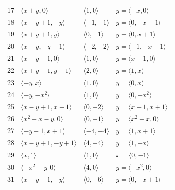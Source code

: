 \documentclass[11pt]{article}
\begin{document}
\begin{longtable}{@{}rlll@{}}
17 & $\langle x+y,0\rangle$ & $\langle 1,0\rangle$ & $y=\langle -x,0\rangle$\\
18 & $\langle x-y+1,-y\rangle$ & $\langle -1,-1\rangle$ & $y=\langle 0,-x-1\rangle$\\
19 & $\langle x+y+1,y\rangle$ & $\langle 0,-1\rangle$ & $y=\langle 0,x+1\rangle$\\
20 & $\langle x-y,-y-1\rangle$ & $\langle -2,-2\rangle$ & $y=\langle -1,-x-1\rangle$\\
21 & $\langle x-y-1,0\rangle$ & $\langle 1,0\rangle$ & $y=\langle x-1,0\rangle$\\
22 & $\langle x+y-1,y-1\rangle$ & $\langle 2,0\rangle$ & $y=\langle 1,x\rangle$\\
23 & $\langle -y,x\rangle$ & $\langle 1,0\rangle$ & $y=\langle 0,x\rangle$\\
24 & $\langle -y,-x^{2}\rangle$ & $\langle 1,0\rangle$ & $y=\langle 0,-x^{2}\rangle$\\
25 & $\langle x-y+1,x+1\rangle$ & $\langle 0,-2\rangle$ & $y=\langle x+1,x+1\rangle$\\
26 & $\langle x^{2}+x-y,0\rangle$ & $\langle 0,-1\rangle$ & $y=\langle x^{2}+x,0\rangle$\\
27 & $\langle -y+1,x+1\rangle$ & $\langle -4,-4\rangle$ & $y=\langle 1,x+1\rangle$\\
28 & $\langle x-y+1,-y+1\rangle$ & $\langle 4,-4\rangle$ & $y=\langle 1,-x\rangle$\\
29 & $\langle x,1\rangle$ & $\langle 1,0\rangle$ & $x=\langle 0,-1\rangle$\\
30 & $\langle -x^{2}-y,0\rangle$ & $\langle 4,0\rangle$ & $y=\langle -x^{2},0\rangle$\\
31 & $\langle x-y-1,-y\rangle$ & $\langle 0,-6\rangle$ & $y=\langle 0,-x+1\rangle$\\
\end{longtable}
\endgroup
\end{document}
